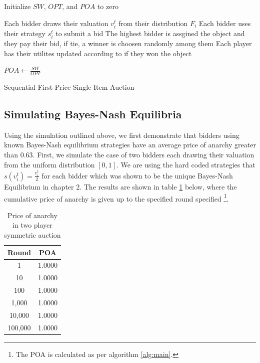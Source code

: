 \documentclass[12pt,twoside]{reedthesis}
\begin{document}
\begin{algorithm}[H]
	Initialize $SW$, $OPT$, and $POA$ to zero\\
	{
		Each bidder draws their valuation $v^t_i$ from their distribution $F_i$\;
		Each bidder uses their strategy $s^t_i$ to submit a bid\;
		The highest bidder is assgined the object and they pay their bid, if tie, a winner is choosen randomly among them\;
		Each player has their utilites updated according to if they won the object\;
	
		$POA \leftarrow \frac{SW}{OPT}$	
	}
\caption{Sequential First-Price Single-Item Auction}
\label{alg:main}
\end{algorithm}


\subsection{Simulating Bayes-Nash Equilibria}
Using the simulation outlined above, we first demonstrate that bidders using known Bayes-Nash equilibrium strategies have an average price of anarchy greater than $0.63$. First, we simulate the case of two bidders each drawing their valuation from the uniform distribution $[0,1]$. We are using the hard coded strategies that $s(v^t_i) = \frac{v^t_i}{2}$ for each bidder which was shown to be the unique Bayes-Nash Equilibrium in chapter 2. The results are shown in table \ref{table:1} below, where the cumulative price of anarchy is given up to the specified round specified 
\footnote{The POA is calculated as per algorithm \ref{alg:main}. %
}.

\begin{table}[h!]
\begin{center}
\begin{tabular}{ |c|c| }
	\hline
	Round & POA \\
	\hline
	1 & 1.0000 \\
	10 & 1.0000 \\
	100 & 1.0000 \\
	1,000 & 1.0000 \\
	10,000 & 1.0000 \\
	100,000 & 1.0000 \\
	\hline
\end{tabular}
\caption{Price of anarchy in two player symmetric auction}
\label{table:1}
\end{center} 
\end{table}
\end{document}
